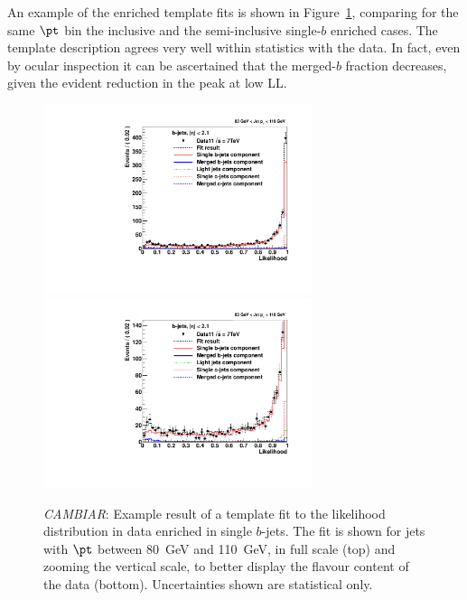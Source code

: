 An example of the enriched template fits is shown in Figure~\ref{fig:fitenriched2btag1}, comparing for the same $\pt$ bin the inclusive and the semi-inclusive single-$b$ enriched cases.  %
The template description agrees very well within statistics with the data. In fact, even by ocular inspection it can be ascertained that the merged-$b$ fraction decreases, given the evident reduction in the peak at low LL. 
\begin{figure}[tp]
\centering
\includegraphics[width=0.7\textwidth]{FIGS/Fits/LikelihoodFit_3param_ETAFull_DataEnriched2btag_Bin2.pdf}
\includegraphics[width=0.7\textwidth]{FIGS/Fits/LikelihoodFit_3param_ETAFull_DataEnriched2btagZOOM_Bin2.pdf}
\caption{{\em CAMBIAR}: Example result of a template fit to the likelihood distribution in data enriched in single $b$-jets. The fit is shown for jets with $\pt$ between  80~GeV and 110~GeV, in full scale (top) and zooming the vertical scale, to better display the flavour content of the data (bottom). Uncertainties shown are statistical only.}
\label{fig:fitenriched2btag1}
\end{figure}

